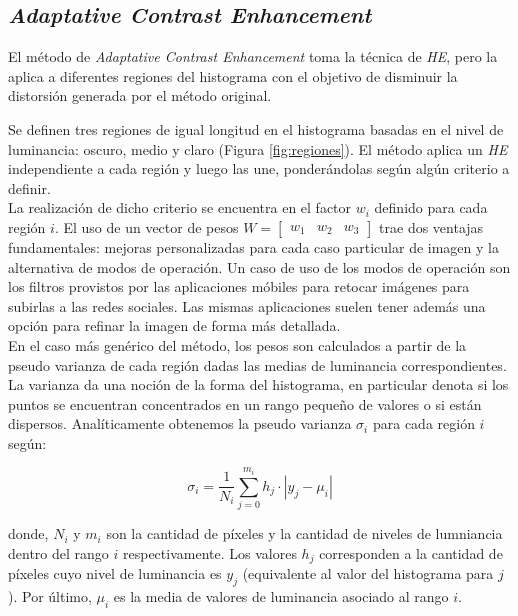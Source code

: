 \subsection{\emph{Adaptative Contrast Enhancement}}

El método de \emph{Adaptative Contrast Enhancement} toma la técnica de
\emph{HE}, pero la aplica a diferentes regiones del histograma con el objetivo
de disminuir la distorsión generada por el método original. \\


Se definen tres regiones de igual longitud en el histograma basadas en el nivel
de luminancia: oscuro, medio y claro (Figura \ref{fig:regiones}). El método
aplica un \emph{HE} independiente a cada región y luego las une, ponderándolas
según algún criterio a definir.\\

La realización de dicho criterio se encuentra en el factor $w_{i}$ definido para
cada región $i$. El uso de un vector de pesos $W = \begin{bmatrix} w_1 & w_2 & w_3 \end{bmatrix}$
trae dos ventajas fundamentales: mejoras personalizadas para cada caso
particular de imagen y la alternativa de modos de operación. Un caso de uso de los modos
de operación son los filtros provistos por las aplicaciones móbiles para retocar
imágenes para subirlas a las redes sociales. Las mismas aplicaciones suelen tener además
una opción para refinar la imagen de forma más detallada.\\

En el caso más genérico del método, los pesos son calculados a partir de la
pseudo varianza de cada región dadas las medias de luminancia
correspondientes. La varianza da una noción de la forma del histograma, en
particular denota si los puntos se encuentran concentrados en un rango pequeño
de valores o si están dispersos. Analíticamente obtenemos la pseudo varianza
$\sigma_i$ para cada región $i$ según:

\begin{equation} \label{eq:sigma}
	\sigma_i = \frac{1}{N_i} \sum_{j=0}^{m_i} h_j \cdot \left|y_j - \mu_i\right|
\end{equation}

donde, $N_i$ y $m_i$ son la cantidad de píxeles y la cantidad de niveles de
lumniancia dentro del rango $i$ respectivamente. Los valores $h_j$ corresponden
a la cantidad de píxeles cuyo nivel de luminancia es $y_j$ (equivalente al valor
del histograma para $j$). Por último, $\mu_i$ es la media de valores de
luminancia asociado al rango $i$.\\

